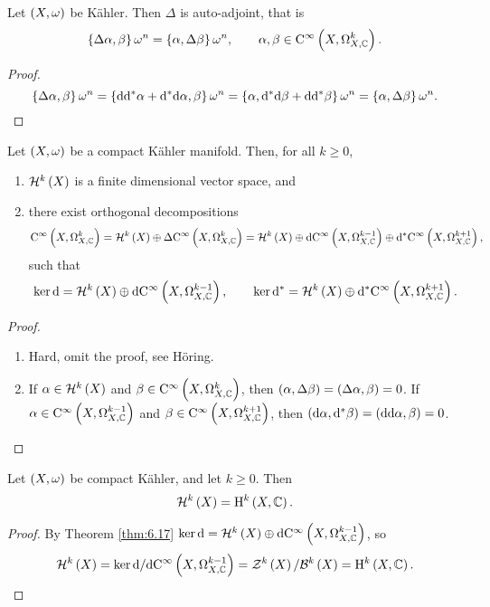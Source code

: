 \begin{lemma}
Let $ \br{X, \omega} $ be K\"ahler. Then $ \Delta $ is auto-adjoint, that is
$$ \cbr{\Delta\alpha, \beta}\omega^n = \cbr{\alpha, \Delta\beta}\omega^n, \qquad \alpha, \beta \in \COC{X}{k}. $$
\end{lemma}

\begin{proof}
$$ \cbr{\Delta\alpha, \beta}\omega^n = \cbr{\d\d^*\alpha + \d^*\d\alpha, \beta}\omega^n = \cbr{\alpha, \d^*\d\beta + \d\d^*\beta}\omega^n = \cbr{\alpha, \Delta\beta}\omega^n. $$
\end{proof}

\begin{theorem}
\label{thm:6.17}
Let $ \br{X, \omega} $ be a compact K\"ahler manifold. Then, for all $ k \ge 0 $,
\begin{enumerate}
\item $ \HHH^k\br{X} $ is a finite dimensional vector space, and
\item there exist orthogonal decompositions
$$ \COC{X}{k} = \HHH^k\br{X} \oplus \Delta\COC{X}{k} = \HHH^k\br{X} \oplus \d\COC{X}{k - 1} \oplus \d^*\COC{X}{k + 1}, $$
such that
$$ \ker \d = \HHH^k\br{X} \oplus \d\COC{X}{k - 1}, \qquad \ker \d^* = \HHH^k\br{X} \oplus \d^*\COC{X}{k + 1}. $$
\end{enumerate}
\end{theorem}

\begin{proof}
\hfill
\begin{enumerate}
\item Hard, omit the proof, see H\"oring.
\item If $ \alpha \in \HHH^k\br{X} $ and $ \beta \in \COC{X}{k} $, then $ \br{\alpha, \Delta\beta} = \br{\Delta\alpha, \beta} = 0 $. If $ \alpha \in \COC{X}{k - 1} $ and $ \beta \in \COC{X}{k + 1} $, then $ \br{\d\alpha, \d^*\beta} = \br{\d\d\alpha, \beta} = 0 $.
\end{enumerate}
\end{proof}

\pagebreak

\begin{theorem}
\label{thm:6.18}
Let $ \br{X, \omega} $ be compact K\"ahler, and let $ k \ge 0 $. Then
$$ \HHH^k\br{X} = \H^k\br{X, \CC}. $$
\end{theorem}

\begin{proof}
By Theorem \ref{thm:6.17} $ \ker \d = \HHH^k\br{X} \oplus \d\COC{X}{k - 1} $, so
$$ \HHH^k\br{X} = \ker \d / \d\COC{X}{k - 1} = \ZZZ^k\br{X} / \BBB^k\br{X} = \H^k\br{X, \CC}. $$
\end{proof}

